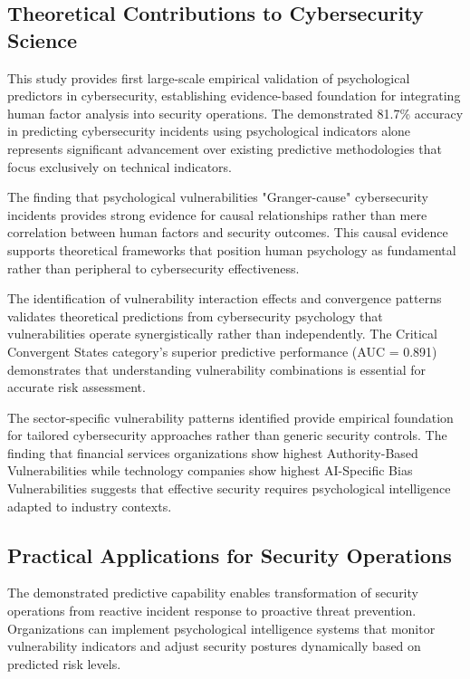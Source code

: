 \documentclass[10pt, twocolumn]{article}
\begin{document}
\subsection{Theoretical Contributions to Cybersecurity Science}

This study provides first large-scale empirical validation of psychological predictors in cybersecurity, establishing evidence-based foundation for integrating human factor analysis into security operations. The demonstrated 81.7\% accuracy in predicting cybersecurity incidents using psychological indicators alone represents significant advancement over existing predictive methodologies that focus exclusively on technical indicators.

The finding that psychological vulnerabilities "Granger-cause" cybersecurity incidents provides strong evidence for causal relationships rather than mere correlation between human factors and security outcomes. This causal evidence supports theoretical frameworks that position human psychology as fundamental rather than peripheral to cybersecurity effectiveness.

The identification of vulnerability interaction effects and convergence patterns validates theoretical predictions from cybersecurity psychology that vulnerabilities operate synergistically rather than independently. The Critical Convergent States category's superior predictive performance (AUC = 0.891) demonstrates that understanding vulnerability combinations is essential for accurate risk assessment.

The sector-specific vulnerability patterns identified provide empirical foundation for tailored cybersecurity approaches rather than generic security controls. The finding that financial services organizations show highest Authority-Based Vulnerabilities while technology companies show highest AI-Specific Bias Vulnerabilities suggests that effective security requires psychological intelligence adapted to industry contexts.

\subsection{Practical Applications for Security Operations}

The demonstrated predictive capability enables transformation of security operations from reactive incident response to proactive threat prevention. Organizations can implement psychological intelligence systems that monitor vulnerability indicators and adjust security postures dynamically based on predicted risk levels.
\end{document}
